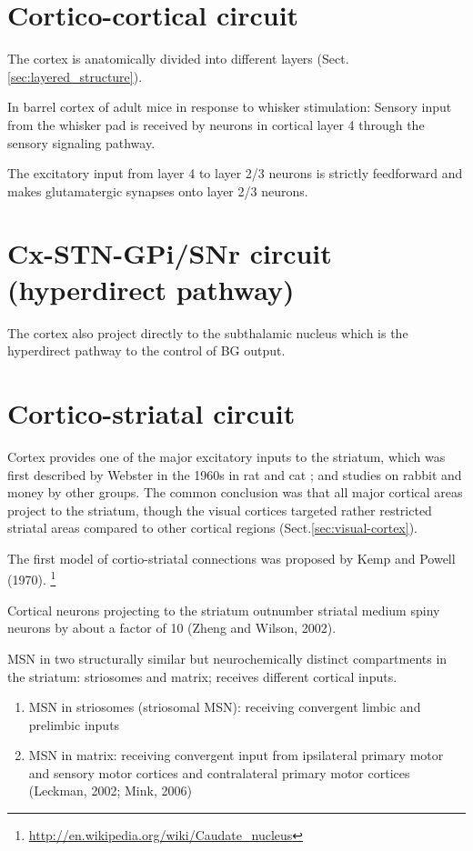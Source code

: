 \section{Cortico-cortical circuit}
\label{sec:cortico-cortical-projection}

The cortex is anatomically divided into different layers
(Sect.\ref{sec:layered_structure}).

In barrel cortex of adult mice in response to whisker stimulation:
Sensory input from the whisker pad is received by neurons in cortical layer 4
through the sensory signaling pathway.

The excitatory input from layer 4 to layer 2/3 neurons is strictly feedforward
and makes glutamatergic synapses onto layer 2/3 neurons.

\section{Cx-STN-GPi/SNr circuit (hyperdirect pathway)}
\label{sec:hyperdirect-pathway}

The cortex also project directly to the subthalamic nucleus which is the
hyperdirect pathway to the control of BG output.

\section{Cortico-striatal circuit}
\label{sec:cortico-striatal-projection}
\label{sec:cortico-striatal-loops}

Cortex provides one of the major excitatory inputs to the striatum, which was
first described by Webster in the 1960s in rat and cat \citep{webster1961,
webster1965}; and studies on rabbit and money by other groups.
The common conclusion was that all major cortical areas project to the striatum,
though the visual cortices targeted rather restricted striatal areas compared to
other cortical regions (Sect.\ref{sec:visual-cortex}).

The first model of cortio-striatal connections was proposed by Kemp and Powell
(1970). \footnote{\url{http://en.wikipedia.org/wiki/Caudate_nucleus}}

Cortical neurons projecting to the striatum outnumber striatal medium spiny
neurons by about a factor of 10 (Zheng and Wilson, 2002).

MSN in two structurally similar but neurochemically distinct compartments in the
striatum: striosomes and matrix; receives different cortical inputs.  
\begin{enumerate}
  
  \item MSN in striosomes (striosomal MSN): receiving   convergent   limbic   and   prelimbic inputs   

  \item MSN in matrix: receiving convergent  input  from  ipsilateral  primary
  motor  and sensory motor cortices and contralateral primary motor cortices
  (Leckman, 2002; Mink, 2006)
  
\end{enumerate}

